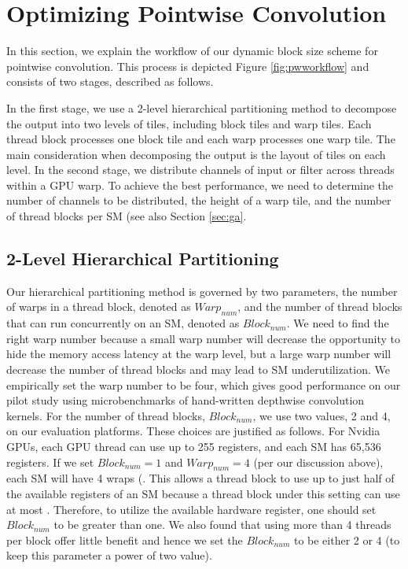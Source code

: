 \section{Optimizing Pointwise Convolution}
\label{sec:pwconv} In this section, we explain the workflow of our dynamic block size scheme for pointwise convolution. This process is
depicted Figure \ref{fig:pwworkflow} and consists of two stages, described as follows.

In the first stage, we use a 2-level hierarchical partitioning method to decompose the output into two levels of tiles, including block
tiles and warp tiles. Each thread block processes one block tile and each warp processes one warp tile. The main consideration when
decomposing the output is the layout of tiles on each level. In the second stage, we distribute channels of input or filter across threads
within a GPU warp. To achieve the best performance, we need to determine the number of channels to be distributed, the height of a warp
tile, and the number of thread blocks per SM (see also Section \ref{sec:ga}.

\subsection{2-Level Hierarchical Partitioning}
Our hierarchical partitioning method is governed by two parameters, the number of warps in a thread block, denoted as $Warp_{num}$, and the
number of thread blocks that can run concurrently on an SM, denoted as $Block_{num}$. We need to find the right warp number because a small
warp number will decrease the opportunity to hide the memory access latency at the warp level, but a large warp number will decrease the
number of thread blocks and may lead to SM underutilization. We empirically set the warp number to be four, which gives good performance on
our pilot study using microbenchmarks of hand-written depthwise convolution kernels. For the number of thread blocks, $Block_{num}$, we use
two values, 2 and 4, on our evaluation platforms. These choices are justified as follows. For Nvidia GPUs, each GPU thread can use up to
255 registers, and each SM has 65,536 registers. If we set $Block_{num}=1$ and $Warp_{num}=4$ (per our discussion above), each SM will have
4 wraps (. This allows a thread block to use up to just half of the available registers of an
SM because a thread block under this setting can use at most . Therefore, to utilize the available hardware register, one should set $Block_{num}$ to be greater than one. We
also found that using more than 4 threads per block offer little benefit and hence we set the $Block_{num}$ to be either 2 or 4 (to keep
this parameter a power of two value).

